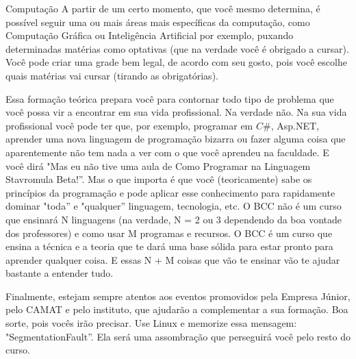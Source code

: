 \begin{subsecao}{Computação}
A partir de um certo momento, que você mesmo determina, é possível seguir uma
ou mais áreas mais específicas da computação, como Computação Gráfica ou
Inteligência Artificial por exemplo, puxando determinadas matérias como
optativas (que na verdade você é obrigado a cursar). Você pode criar uma grade
bem legal, de acordo com seu gosto, pois você escolhe quais matérias vai
cursar (tirando as obrigatórias).

Essa formação teórica prepara você para contornar todo tipo de problema que
você possa vir a encontrar em sua vida profissional. Na verdade não. Na sua
vida profissional você pode ter que, por exemplo, programar em $C\#$, Asp.NET,
aprender uma nova linguagem de programação bizarra ou fazer alguma coisa que
aparentemente não tem nada a ver com o que você aprendeu na faculdade. E você
dirá "Mas eu não tive uma aula de Como Programar na Linguagem Stavromula
Beta!”. Mas o que importa é que você (teoricamente) sabe os princípios da
programação e pode aplicar esse conhecimento para rapidamente dominar "toda”
e "qualquer” linguagem, tecnologia, etc. O BCC não é um curso que ensinará N
linguagens (na verdade, N = 2 ou 3 dependendo da boa vontade dos professores) e
como usar M programas e recursos. O BCC é um curso que ensina a técnica e a
teoria que te dará uma base sólida para estar pronto para aprender qualquer
coisa. E essas N + M coisas que vão te ensinar vão te ajudar bastante a
entender tudo.

Finalmente, estejam sempre atentos aos eventos promovidos pela Empresa Júnior,
pelo CAMAT e pelo instituto, que ajudarão a complementar a sua formação. Boa
sorte, pois vocês irão precisar. Use Linux e memorize essa
mensagem: "SegmentationFault”. Ela será uma assombração que perseguirá você
pelo resto do curso.

\end{subsecao}
